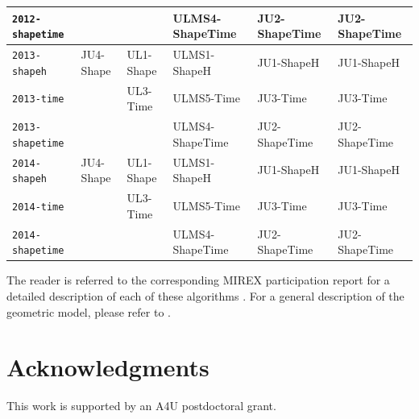 \documentclass[twoside]{article}
\begin{document}
\begin{table}[!h]
\begin{tabular}{l|lllll}
	\texttt{2012-shapetime}  &                         &                    & \textsf{ULMS4-ShapeTime} & \textsf{JU2-ShapeTime} & \textsf{JU2-ShapeTime} \\ \hline
	\texttt{2013-shapeh}     & \textsf{JU4-Shape}      & \textsf{UL1-Shape} & \textsf{ULMS1-ShapeH}    & \textsf{JU1-ShapeH}    & \textsf{JU1-ShapeH}    \\
	\texttt{2013-time}       &                         & \textsf{UL3-Time}  & \textsf{ULMS5-Time}      & \textsf{JU3-Time}      & \textsf{JU3-Time}      \\
	\texttt{2013-shapetime}  &                         &                    & \textsf{ULMS4-ShapeTime} & \textsf{JU2-ShapeTime} & \textsf{JU2-ShapeTime} \\ \hline
	\texttt{2014-shapeh}     & \textsf{JU4-Shape}      & \textsf{UL1-Shape} & \textsf{ULMS1-ShapeH}    & \textsf{JU1-ShapeH}    & \textsf{JU1-ShapeH}    \\
	\texttt{2014-time}       &                         & \textsf{UL3-Time}  & \textsf{ULMS5-Time}      & \textsf{JU3-Time}      & \textsf{JU3-Time}      \\
	\texttt{2014-shapetime}  &                         &                    & \textsf{ULMS4-ShapeTime} & \textsf{JU2-ShapeTime} & \textsf{JU2-ShapeTime} \\ \hline
\end{tabular}
\end{table}

The reader is referred to the corresponding MIREX participation report for a detailed description of each of these algorithms \cite{Urbano2010:mirex2010,Urbano2011:mirex2011,Urbano2012:mirex2012,Urbano2013:mirex2013,Urbano2014:mirex2014}. For a general description of the geometric model, please refer to \cite{Urbano2011:shape}.

\section*{Acknowledgments}
This work is supported by an A4U postdoctoral grant.



\end{document}
